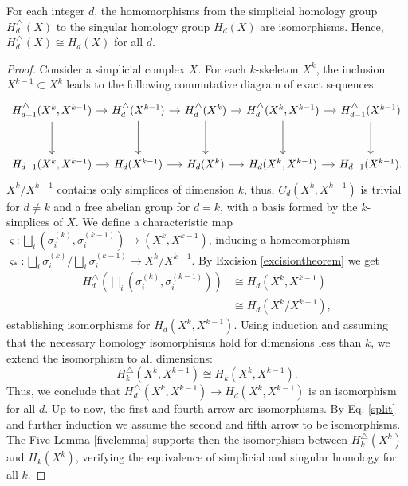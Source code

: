 \begin{theorem}{\cite[Theorem 2.27]{hatcher2005algebraic}}
	For each integer $d$, the homomorphisms from the simplicial homology group
	$H^{\triangle}_{d}(X)$ to the singular homology group $H_{d}(X)$ are isomorphisms.
	Hence, $H_{d}^{\triangle}(X) \cong H_{d}(X)$ for all $d$.
\end{theorem}

\begin{proof}
	Consider a simplicial complex $X$. For each $k$-skeleton $X^{k}$, the inclusion $X^{k-1} \subset X^{k}$ leads to the following commutative diagram of exact sequences:
	\begin{equation*}		
		\begin{tikzcd}[row sep=3em, column sep = 1em]
			H^\triangle_{d+1}(X^k,X^{k-1}) \arrow[d] \arrow[r] & H^\triangle_{d}(X^{k-1}) \arrow[d] \arrow[r] & H^\triangle_{d}(X^k) \arrow[d] \arrow[r] & H^\triangle_{d}(X^k,X^{k-1}) \arrow[d] \arrow[r] & H^\triangle_{d-1}(X^{k-1}) \arrow[d] \\
			H_{d+1}(X^k,X^{k-1}) \arrow[r] & H_{d}(X^{k-1}) \arrow[r] & H_{d}(X^k) \arrow[r] & H_{d}(X^k,X^{k-1}) \arrow[r] & H_{d-1}(X^{k-1}).
		\end{tikzcd}
	\end{equation*}			
	$X^{k}/X^{k-1}$ contains only simplices of dimension $k$, thus, $C_{d}(X^{k}, X^{k-1})$ is trivial for $d \neq k$ and a free abelian group for $d = k$, with a basis formed by the $k$-simplices of $X$. We define a characteristic map $\varsigma: \bigsqcup_{i}(\sigma^{(k)}_{i}, \sigma^{(k-1)}_{i}) \rightarrow (X^{k}, X^{k-1})$, inducing a homeomorphism $\varsigma_\ast: \bigsqcup_{i} \sigma^{(k)}_{i}/\bigsqcup_{i} \sigma^{(k-1)}_{i} \rightarrow X^{k}/X^{k-1}$. By Excision \ref{excisiontheorem} we get 
	\begin{align}
		\label{split}
		H^\triangle_{d}\left(\bigsqcup_{i} (\sigma^{(k)}_{i}, \sigma^{(k-1)}_{i})\right) &\cong H_{d}(X^{k}, X^{k-1}) \nonumber\\
		&\cong H_{d}(X^{k}/X^{k-1}),
	\end{align}
	establishing isomorphisms for $H_{d}(X^{k}, X^{k-1})$. Using induction and assuming that the necessary homology isomorphisms hold for dimensions less than $k$, we extend the isomorphism to all dimensions:
	\begin{equation}
		H_{k}^{\triangle}(X^{k},X^{k-1}) \cong H_{k}(X^{k},X^{k-1}).
	\end{equation}
	 Thus, we conclude that $H_{d}^{\triangle}(X^{k}, X^{k-1}) \rightarrow H_{d}(X^{k}, X^{k-1})$ is an isomorphism for all $d$. Up to now, the first and fourth arrow are isomorphisms. By Eq. \ref{split} and further induction we assume the second and fifth arrow to be isomorphisms. The Five Lemma \ref{fivelemma} supports then the isomorphism between $H_{k}^{\triangle}(X^{k})$ and $H_{k}(X^{k})$, verifying the equivalence of simplicial and singular homology for all $k$.
\end{proof}